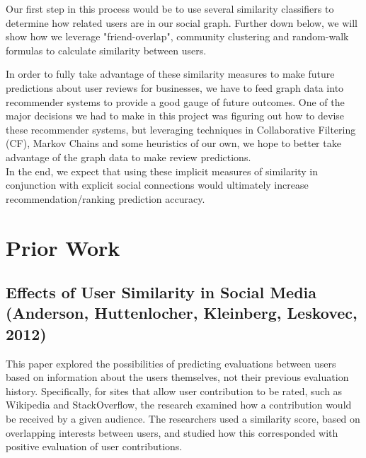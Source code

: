 \documentclass[10pt]{article}
\begin{document}
Our first step in this process would be to use several similarity classifiers to determine how related users are in our social graph. Further down below, we will show how we leverage "friend-overlap", community clustering and random-walk formulas to calculate similarity between users.

In order to fully take advantage of these similarity measures to make future predictions about user reviews for businesses, we have to feed graph data into recommender systems to provide a good gauge of future outcomes. One of the major decisions we had to make in this project was figuring out how to devise these recommender systems, but leveraging techniques in Collaborative Filtering (CF), Markov Chains and some heuristics of our own, we hope to better take advantage of the graph data to make review predictions.\\

In the end, we expect that using these implicit measures of similarity in conjunction with explicit social connections would ultimately increase recommendation/ranking prediction accuracy.

\section{Prior Work}
\label{sec:meth}

\subsection{Effects of User Similarity in Social Media (Anderson, Huttenlocher, Kleinberg, Leskovec, 2012)}

This paper explored the possibilities of predicting evaluations between users based on information about the users themselves, not their previous evaluation history. Specifically, for sites that allow user contribution to be rated, such as Wikipedia and StackOverflow, the research examined how a contribution would be received by a given audience. The researchers used a similarity score, based on overlapping interests between users, and studied how this corresponded with positive evaluation of user contributions. \\

\end{document}

